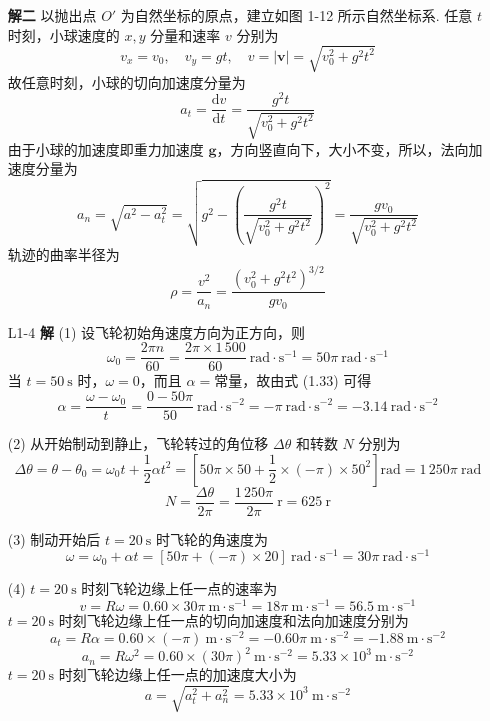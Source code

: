 \begin{enumerate}
\textbf{解二} \quad 以抛出点 $O'$ 为自然坐标的原点，建立如图 1-12 所示自然坐标系. 任意 $t$ 时刻，小球速度的 $x, y$ 分量和速率 $v$ 分别为
\[
v_x = v_0, \quad v_y = gt, \quad v = |\boldsymbol{v}| = \sqrt{v_0^2 + g^2 t^2}
\]
故任意时刻，小球的切向加速度分量为
\[
a_t = \frac{\mathrm{d}v}{\mathrm{d}t} = \frac{g^2 t}{\sqrt{v_0^2 + g^2 t^2}}
\]
由于小球的加速度即重力加速度 $\boldsymbol{g}$，方向竖直向下，大小不变，所以，法向加速度分量为
\[
a_n = \sqrt{a^2 - a_t^2} = \sqrt{g^2 - \left( \frac{g^2 t}{\sqrt{v_0^2 + g^2 t^2}} \right)^2} = \frac{g v_0}{\sqrt{v_0^2 + g^2 t^2}}
\]
轨迹的曲率半径为
\[
\rho = \frac{v^2}{a_n} = \frac{\left(v_0^2 + g^2 t^2\right)^{3/2}}{g v_0}
\]

\item[L1-4]
\textbf{解} \quad (1) 设飞轮初始角速度方向为正方向，则
\[
\omega_0 = \frac{2\pi n}{60} = \frac{2\pi \times 1\,500}{60} \mathrm{\ rad \cdot s^{-1}} = 50\pi \mathrm{\ rad \cdot s^{-1}}
\]
当 $t = 50 \mathrm{\ s}$ 时，$\omega = 0$，而且 $\alpha = \text{常量}$，故由式 (1.33) 可得
\[
\alpha = \frac{\omega - \omega_0}{t} = \frac{0 - 50\pi}{50} \mathrm{\ rad \cdot s^{-2}} = -\pi \mathrm{\ rad \cdot s^{-2}} = -3.14 \mathrm{\ rad \cdot s^{-2}}
\]

(2) 从开始制动到静止，飞轮转过的角位移 $\Delta\theta$ 和转数 $N$ 分别为
\[
\Delta\theta = \theta - \theta_0 = \omega_0 t + \frac{1}{2}\alpha t^2 = \left[ 50\pi \times 50 + \frac{1}{2} \times (-\pi) \times 50^2 \right] \mathrm{rad} = 1\,250\pi \mathrm{\ rad}
\]
\[
N = \frac{\Delta\theta}{2\pi} = \frac{1\,250\pi}{2\pi} \mathrm{\ r} = 625 \mathrm{\ r}
\]

(3) 制动开始后 $t = 20 \mathrm{\ s}$ 时飞轮的角速度为
\[
\omega = \omega_0 + \alpha t = \left[ 50\pi + (-\pi) \times 20 \right] \mathrm{\ rad \cdot s^{-1}} = 30\pi \mathrm{\ rad \cdot s^{-1}}
\]

(4) $t = 20 \mathrm{\ s}$ 时刻飞轮边缘上任一点的速率为
\[
v = R\omega = 0.60 \times 30\pi \mathrm{\ m \cdot s^{-1}} = 18\pi \mathrm{\ m \cdot s^{-1}} = 56.5 \mathrm{\ m \cdot s^{-1}}
\]
$t = 20 \mathrm{\ s}$ 时刻飞轮边缘上任一点的切向加速度和法向加速度分别为
\[
a_t = R\alpha = 0.60 \times (-\pi) \mathrm{\ m \cdot s^{-2}} = -0.60\pi \mathrm{\ m \cdot s^{-2}} = -1.88 \mathrm{\ m \cdot s^{-2}}
\]
\[
a_n = R\omega^2 = 0.60 \times (30\pi)^2 \mathrm{\ m \cdot s^{-2}} = 5.33 \times 10^3 \mathrm{\ m \cdot s^{-2}}
\]
$t = 20 \mathrm{\ s}$ 时刻飞轮边缘上任一点的加速度大小为
\[
a = \sqrt{a_t^2 + a_n^2} = 5.33 \times 10^3 \mathrm{\ m \cdot s^{-2}}
\]

\vspace{2em}


\end{enumerate}
